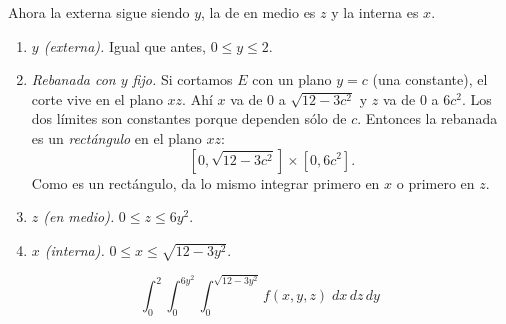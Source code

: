 \begin{respuesta}
    \bigskip
     Ahora la externa sigue siendo $y$, la de en
    medio es $z$ y la interna es $x$.
    \begin{enumerate}
        \item \emph{$y$ (externa).} Igual que antes, $0\leq y\leq 2$.
        \item \emph{Rebanada con $y$ fijo.} Si cortamos $E$ con un plano $y=c$ (una
              constante), el corte vive en el plano $xz$. Ahí $x$ va de $0$ a
              $\sqrt{12-3c^2}$ y $z$ va de $0$ a $6c^2$. Los dos límites son
              constantes porque dependen sólo de $c$. Entonces la rebanada es un
              \emph{rectángulo} en el plano $xz$:
              \[
                  [0,\sqrt{12-3c^2}]\times[0,6c^2].
              \]
              Como es un rectángulo, da lo mismo integrar primero en $x$ o primero
              en $z$.
        \item \emph{$z$ (en medio).} $0\leq z\leq 6y^2$.
        \item \emph{$x$ (interna).} $0\leq x\leq\sqrt{12-3y^2}$.
    \end{enumerate}
    \[
        \boxed{\;\int_{0}^{2}\int_{0}^{6y^2}\int_{0}^{\sqrt{12-3y^2}} f(x,y,z)\; dx\,dz\,dy\;}
    \]
    


\end{respuesta}
